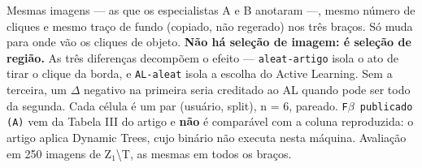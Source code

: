 \footnotesize Mesmas imagens --- as que os especialistas A e B anotaram ---, mesmo número de cliques e mesmo traço de fundo (copiado, não regerado) nos três braços. Só muda para onde vão os cliques de objeto. \textbf{Não há seleção de imagem: é seleção de região.} As três diferenças decompõem o efeito --- \texttt{aleat-artigo} isola o ato de tirar o clique da borda, e \texttt{AL-aleat} isola a escolha do Active Learning. Sem a terceira, um $\Delta$ negativo na primeira seria creditado ao AL quando pode ser todo da segunda. Cada célula é um par (usuário, split), n = 6, pareado. \texttt{F$\beta$ publicado (A)} vem da Tabela III do artigo e \textbf{não} é comparável com a coluna reproduzida: o artigo aplica Dynamic Trees, cujo binário não executa nesta máquina. Avaliação em 250 imagens de Z$_1$\textbackslash{}T, as mesmas em todos os braços.
\normalsize
